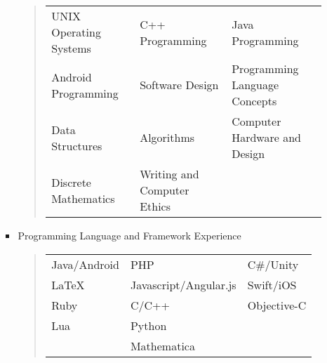 \begin{enumerate}[label={\Roman*}.]
\begin{itemize}
\begin{itemize}
\begin{quote}
	      	      	      	\def\arraystretch{1.1}
	      	      	      	\begin{tabular}{l l l}
	      	      	      		UNIX Operating Systems & C++ Programming & Java Programming              \\
	      	      	      		Android Programming    & Software Design & Programming Language Concepts \\
	      	      	      		Data Structures        & Algorithms      & Computer Hardware and Design  \\
	      	      	      		Discrete Mathematics & Writing and Computer Ethics
	      	      	      	\end{tabular}
	      	      	      \end{quote}
	      	      	\item Programming Language and Framework Experience
	      	      	      \begin{quote}
	      	      	      	\def\arraystretch{1.1}
	      	      	      	\begin{tabular}{l l l}
	      	      	      		Java/Android & PHP                   & C\#/Unity   \\
	      	      	      		\LaTeX       & Javascript/Angular.js & Swift/iOS   \\
	      	      	      		Ruby         & C/C++                 & Objective-C \\
	      	      	      		Lua          & Python                &             \\
	      	      	      		             & Mathematica           &
	      	      	      	\end{tabular}
	      	      	      \end{quote}
	      	      \end{itemize}
	      \end{itemize}
\end{enumerate}
